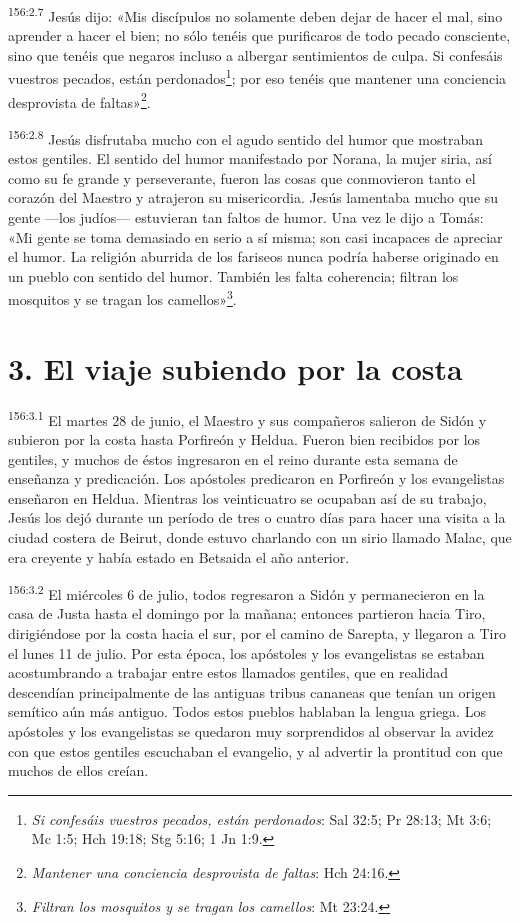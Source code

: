 \par 
\textsuperscript{156:2.7} Jesús dijo: «Mis discípulos no solamente deben dejar de hacer el mal, sino aprender a hacer el bien; no sólo tenéis que purificaros de todo pecado consciente, sino que tenéis que negaros incluso a albergar sentimientos de culpa. Si confesáis vuestros pecados, están perdonados\footnote{\textit{Si confesáis vuestros pecados, están perdonados}: Sal 32:5; Pr 28:13; Mt 3:6; Mc 1:5; Hch 19:18; Stg 5:16; 1 Jn 1:9.}; por eso tenéis que mantener una conciencia desprovista de faltas»\footnote{\textit{Mantener una conciencia desprovista de faltas}: Hch 24:16.}.

\par 
\textsuperscript{156:2.8} Jesús disfrutaba mucho con el agudo sentido del humor que mostraban estos gentiles. El sentido del humor manifestado por Norana, la mujer siria, así como su fe grande y perseverante, fueron las cosas que conmovieron tanto el corazón del Maestro y atrajeron su misericordia. Jesús lamentaba mucho que su gente ---los judíos--- estuvieran tan faltos de humor. Una vez le dijo a Tomás: «Mi gente se toma demasiado en serio a sí misma; son casi incapaces de apreciar el humor. La religión aburrida de los fariseos nunca podría haberse originado en un pueblo con sentido del humor. También les falta coherencia; filtran los mosquitos y se tragan los camellos»\footnote{\textit{Filtran los mosquitos y se tragan los camellos}: Mt 23:24.}.

\section*{3. El viaje subiendo por la costa}
\par 
\textsuperscript{156:3.1} El martes 28 de junio, el Maestro y sus compañeros salieron de Sidón y subieron por la costa hasta Porfireón y Heldua. Fueron bien recibidos por los gentiles, y muchos de éstos ingresaron en el reino durante esta semana de enseñanza y predicación. Los apóstoles predicaron en Porfireón y los evangelistas enseñaron en Heldua. Mientras los veinticuatro se ocupaban así de su trabajo, Jesús los dejó durante un período de tres o cuatro días para hacer una visita a la ciudad costera de Beirut, donde estuvo charlando con un sirio llamado Malac, que era creyente y había estado en Betsaida el año anterior.

\par 
\textsuperscript{156:3.2} El miércoles 6 de julio, todos regresaron a Sidón y permanecieron en la casa de Justa hasta el domingo por la mañana; entonces partieron hacia Tiro, dirigiéndose por la costa hacia el sur, por el camino de Sarepta, y llegaron a Tiro el lunes 11 de julio. Por esta época, los apóstoles y los evangelistas se estaban acostumbrando a trabajar entre estos llamados gentiles, que en realidad descendían principalmente de las antiguas tribus cananeas que tenían un origen semítico aún más antiguo. Todos estos pueblos hablaban la lengua griega. Los apóstoles y los evangelistas se quedaron muy sorprendidos al observar la avidez con que estos gentiles escuchaban el evangelio, y al advertir la prontitud con que muchos de ellos creían.

